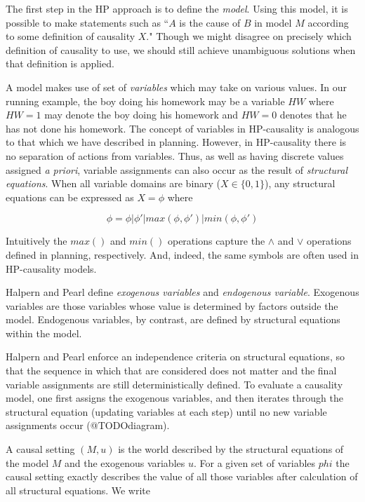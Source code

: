 \documentclass{article}
\theoremstyle{plain}
\theoremstyle{definition}
\begin{document}
The first step in the HP approach is to define the \textit{model}. Using this model, it is possible to make statements such as ``$A$ is the cause of $B$ in  model $M$ according to some definition of causality $X$." Though we might disagree on precisely which definition of causality to use, we should still achieve unambiguous solutions when that definition is applied. 

A model makes use of set of \textit{variables} which may take on various values. In our running example, the boy doing his homework may be a variable $HW$ where $HW=1$ may denote the boy doing his homework and $HW=0$ denotes that he has not done his homework. The concept of variables in HP-causality is analogous to that which we have described in planning. However, in HP-causality there is no separation of actions from variables. Thus, as well as having discrete values assigned \textit{a priori}, variable assignments can also occur as the result of \textit{structural equations}. When all variable domains are binary ($X \in \{0,1\}$), any structural equations can be expressed as $X=\phi$ where

\[
\phi= \phi | \phi' | max(\phi, \phi') | min(\phi, \phi') 
\]

Intuitively the $max()$ and $min()$ operations capture the $\land$ and $\lor$ operations defined in planning, respectively. And, indeed, the same symbols are often used in HP-causality models.

Halpern and Pearl define \textit{exogenous variables} and \textit{endogenous variable}. Exogenous variables are those variables whose value is determined by factors outside the model. Endogenous variables, by contrast, are defined by structural equations within the model.

Halpern and Pearl enforce an independence criteria on structural equations, so that the sequence in which that are considered does not matter and the final variable assignments are still deterministically defined. To evaluate a causality model, one first assigns the exogenous variables, and then iterates through the structural equation (updating variables at each step) until no new variable assignments occur (@TODOdiagram).

A causal setting $(M,u)$ is the world described by the structural equations of the model $M$ and the exogenous variables $u$. For a given set of variables $phi$ the causal setting exactly describes the value of all those variables after calculation of all structural equations. We write
\end{document}
